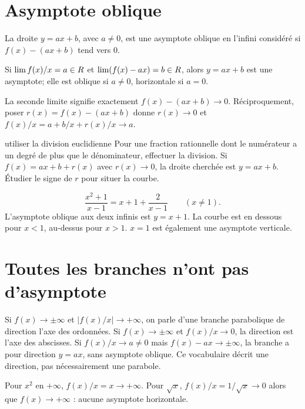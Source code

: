 \section{Asymptote oblique}
\begin{definition}La droite $y=ax+b$, avec $a\ne0$, est une asymptote oblique en l’infini considéré si $f(x)-(ax+b)$ tend vers $0$.\end{definition}
\begin{propriete}
Si $\lim f(x)/x=a\in\R$ et $\lim(f(x)-ax)=b\in\R$, alors $y=ax+b$ est une asymptote; elle est oblique si $a\ne0$, horizontale si $a=0$.
\end{propriete}
\begin{demonstration}La seconde limite signifie exactement $f(x)-(ax+b)\to0$. Réciproquement, poser $r(x)=f(x)-(ax+b)$ donne $r(x)\to0$ et $f(x)/x=a+b/x+r(x)/x\to a$.\end{demonstration}
\begin{methode}{utiliser la division euclidienne}
Pour une fraction rationnelle dont le numérateur a un degré de plus que le dénominateur, effectuer la division. Si $f(x)=ax+b+r(x)$ avec $r(x)\to0$, la droite cherchée est $y=ax+b$. Étudier le signe de $r$ pour situer la courbe.
\end{methode}
\begin{exemple}
\[
\frac{x^2+1}{x-1}=x+1+\frac2{x-1}\qquad(x\ne1).
\]
L’asymptote oblique aux deux infinis est $y=x+1$. La courbe est en dessous pour $x<1$, au-dessus pour $x>1$. $x=1$ est également une asymptote verticale.
\end{exemple}
\section{Toutes les branches n’ont pas d’asymptote}
\begin{remarque}Si $f(x)\to\pm\infty$ et $|f(x)/x|\to+\infty$, on parle d’une branche parabolique de direction l’axe des ordonnées. Si $f(x)\to\pm\infty$ et $f(x)/x\to0$, la direction est l’axe des abscisses. Si $f(x)/x\to a\ne0$ mais $f(x)-ax\to\pm\infty$, la branche a pour direction $y=ax$, sans asymptote oblique. Ce vocabulaire décrit une direction, pas nécessairement une parabole.\end{remarque}
Pour $x^2$ en $+\infty$, $f(x)/x=x\to+\infty$. Pour $\sqrt x$, $f(x)/x=1/\sqrt x\to0$ alors que $f(x)\to+\infty$ : aucune asymptote horizontale.


